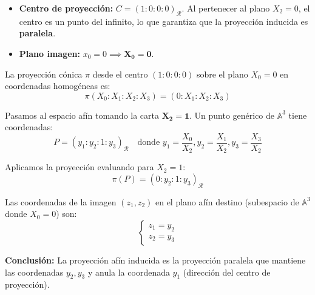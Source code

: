 {\begin{itemize}
    \item \textbf{Centro de proyección:} $C = (1 : 0 : 0 : 0)_{\mathcal{R}}$. Al pertenecer al plano $X_2=0$, el centro es un punto del infinito, lo que garantiza que la proyección inducida es \textbf{paralela}.
    
    \item \textbf{Plano imagen:} $x_0 = 0 \implies \mathbf{X_0 = 0}$.
\end{itemize}


La proyección cónica $\pi$ desde el centro $(1:0:0:0)$ sobre el plano $X_0=0$ en coordenadas homogéneas es:
\[ \pi(X_0 : X_1 : X_2 : X_3) = (0 : X_1 : X_2 : X_3) \]

Pasamos al espacio afín tomando la carta $\mathbf{X_2 = 1}$. Un punto genérico de $\mathbb{A}^3$ tiene coordenadas:
\[ P = (y_1 : y_2 : 1 : y_3)_{\mathcal{R}} \quad \text{donde } y_1 = \frac{X_0}{X_2}, y_2 = \frac{X_1}{X_2}, y_3 = \frac{X_3}{X_2} \]

Aplicamos la proyección evaluando para $X_2=1$:
\[ \pi(P) = (0 : y_2 : 1 : y_3)_{\mathcal{R}} \]

Las coordenadas de la imagen $(z_1, z_2)$ en el plano afín destino (subespacio de $\mathbb{A}^3$ donde $X_0=0$) son:
\[ \begin{cases} z_1 = y_2 \\ z_2 = y_3 \end{cases} \]

\textbf{Conclusión:} La proyección afín inducida es la proyección paralela que mantiene las coordenadas $y_2, y_3$ y anula la coordenada $y_1$ (dirección del centro de proyección).}

